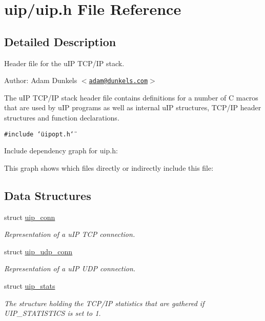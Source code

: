 \hypertarget{a00054}{
\section{uip/uip.h File Reference}
\label{a00054}
}


\subsection{Detailed Description}
Header file for the u\-IP TCP/IP stack. 

\begin{Desc}
\item[Author:]Adam Dunkels $<$\href{mailto:adam@dunkels.com}{\tt adam@dunkels.com}$>$\end{Desc}
The u\-IP TCP/IP stack header file contains definitions for a number of C macros that are used by u\-IP programs as well as internal u\-IP structures, TCP/IP header structures and function declarations. 

{\tt \#include \char`\"{}uipopt.h\char`\"{}}\par


Include dependency graph for uip.h:

This graph shows which files directly or indirectly include this file:\subsection*{Data Structures}
\begin{CompactItemize}
\item 
struct \hyperlink{a00028}{uip\_\-conn}
\begin{CompactList}\small\item\em Representation of a u\-IP TCP connection. \item\end{CompactList}\item 
struct \hyperlink{a00032}{uip\_\-udp\_\-conn}
\begin{CompactList}\small\item\em Representation of a u\-IP UDP connection. \item\end{CompactList}\item 
struct \hyperlink{a00031}{uip\_\-stats}
\begin{CompactList}\small\item\em The structure holding the TCP/IP statistics that are gathered if UIP\_\-STATISTICS is set to 1. \item\end{CompactList}\end{CompactItemize}
